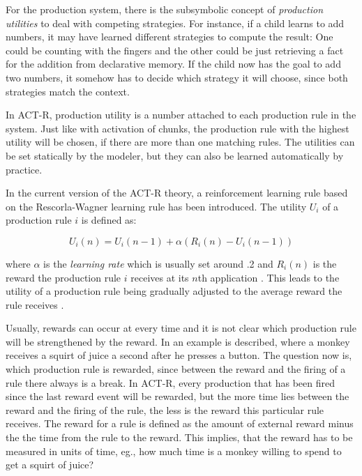 For the production system, there is the subsymbolic concept of \emph{production utilities} to deal with competing strategies. For instance, if a child learns to add numbers, it may have learned different strategies to compute the result: One could be counting with the fingers and the other could be just retrieving a fact for the addition from declarative memory. If the child now has the goal to add two numbers, it somehow has to decide which strategy it will choose, since both strategies match the context.

In ACT-R, production utility is a number attached to each production rule in the system. Just like with activation of chunks, the production rule with the highest utility will be chosen, if there are more than one matching rules. The utilities can be set statically by the modeler, but they can also be learned automatically by practice.

In the current version of the ACT-R theory, a reinforcement learning rule based on the Rescorla-Wagner learning rule \cite{rescorla_wagner_1972} has been introduced. The utility $U_i$ of a production rule $i$ is defined as:

\begin{equation}
U_i(n) = U_i(n - 1) + \alpha \left(R_i(n) - U_i(n - 1)\right)
\end{equation}

where $\alpha$ is the \emph{learning rate} which is usually set around .2 and $R_i(n)$ is the reward the production rule $i$ receives at its $n$th application \cite[pp. 160--161]{anderson_how_2007}. This leads to the utility of a production rule being gradually adjusted to the average reward the rule receives \cite[pp. 6--7]{actr_tutorial}. 

Usually, rewards can occur at every time and it is not clear which production rule will be strengthened by the reward. In \cite[p. 161]{anderson_how_2007} an example is described, where a monkey receives a squirt of juice a second after he presses a button. The question now is, which production rule is rewarded, since between the reward and the firing of a rule there always is a break. In ACT-R, every production that has been fired since the last reward event will be rewarded, but the more time lies between the reward and the firing of the rule, the less is the reward this particular rule receives. The reward for a rule is defined as the amount of external reward minus the the time from the rule to the reward. This implies, that the reward has to be measured in units of time, eg., how much time is a monkey willing to spend to get a squirt of juice? \cite[p. 161]{anderson_how_2007}

